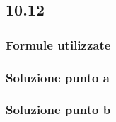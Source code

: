 \documentclass[../../main.tex]{subfiles}
\begin{document}
\subsection*{10.12}
\subsubsection*{Formule utilizzate}
\subsubsection*{Soluzione punto a}
\subsubsection*{Soluzione punto b}
\newpage
\end{document}
